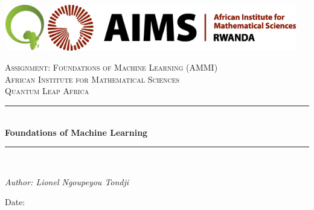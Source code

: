 \documentclass[12pt,twoside]{article}
\newcommand{\reporttitle}{Foundations of Machine Learning}
\newcommand{\reporttype}{Assignment: Foundations of Machine Learning (AMMI)}
\begin{document}

\begin{titlepage}
\newcommand{\HRule}{\rule{\linewidth}{0.5mm}} %



\begin{center}
\includegraphics[height = 2cm]{qla}\hspace{4mm}
\includegraphics[height=2cm]{aims-rwanda}
\end{center}
 

\begin{center} %

\textsc{\LARGE \reporttype}\\[1.5cm] 
\textsc{\Large African Institute for Mathematical Sciences}\\[0.5cm] 
\textsc{\large Quantum Leap Africa}\\[0.5cm] 

\HRule \\[0.4cm]
{ \huge \bfseries \reporttitle}\\ %
\HRule \\[1.5cm]
\end{center}

\begin{minipage}{0.4\hsize}
 \begin{flushleft} \large
 \textit{Author: Lionel Ngoupeyou Tondji}\\
 \end{flushleft}
  \vspace{2cm}
 \makeatletter
 Date: \@date 
\end{minipage}
\vfill %



\makeatother

\end{titlepage}
\end{document}
